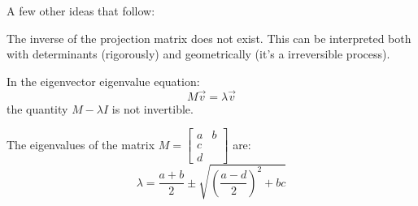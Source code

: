 \documentclass{article}
\begin{document}
A few other ideas that follow:
\begin{idea}
    The inverse of the projection matrix does not exist. This can be interpreted both with determinants (rigorously) and geometrically (it's a irreversible process).
\end{idea}
\begin{idea}
    In the eigenvector eigenvalue equation:
    \begin{equation}
        M\vec{v} = \lambda\vec{v}
        \label{eq:}
    \end{equation}
    the quantity $M-\lambda I$ is not invertible.
\end{idea}
\begin{idea}
    The eigenvalues of the matrix $M=\begin{bmatrix}
        a&b\\c\\d
    \end{bmatrix}$ are:
    \begin{equation}
        \lambda = \frac{a+b}{2} \pm \sqrt{\left(\frac{a-d}{2}\right)^2+bc}
        \label{eq:}
    \end{equation}
    
\end{idea}
\end{document}
